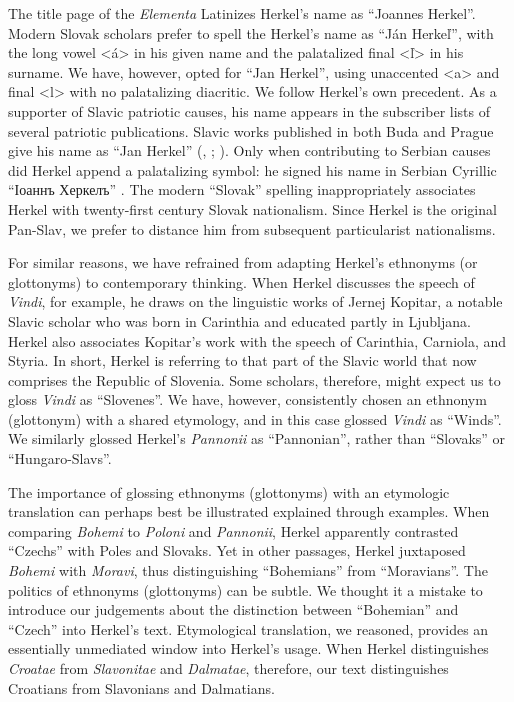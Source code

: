 The title page of the \textit{Elementa} Latinizes Herkel’s name as “Joannes Herkel”. Modern Slovak scholars prefer to spell the Herkel’s name as “Ján Herkeľ”, with the long vowel <á> in his given name and the palatalized final <ľ> in his surname. We have, however, opted for “Jan Herkel”, using unaccented <a> and final <l> with no palatalizing diacritic. We follow Herkel’s own precedent. As a supporter of Slavic patriotic causes, his name appears in the subscriber lists of several patriotic publications. Slavic works published in both Buda and Prague give his name as “Jan Herkel” (, \cite[no page numbers]{anon_gmena_1827}; \cite[no page numbers]{kollar_rozprawy_1830}). Only when contributing to Serbian causes did Herkel append a palatalizing symbol: he signed his name in Serbian Cyrillic “Іоаннъ Херкелъ” \citep[no page numbers]{pacic_dodatak_1827}. The modern “Slovak” spelling inappropriately associates Herkel with twenty-first century Slovak nationalism. Since Herkel is the original Pan-Slav, we prefer to distance him from subsequent particularist nationalisms.

For similar reasons, we have refrained from adapting Herkel’s ethnonyms (or glottonyms) to contemporary thinking. When Herkel discusses the speech of \textit{Vindi}, for example, he draws on the linguistic works of Jernej Kopitar, a notable Slavic scholar who was born in Carinthia and educated partly in Ljubljana. Herkel also associates Kopitar’s work with the speech of Carinthia, Carniola, and Styria. In short, Herkel is referring to that part of the Slavic world that now comprises the Republic of Slovenia. Some scholars, therefore, might expect us to gloss \textit{Vindi} as “Slovenes”. We have, however, consistently chosen an ethnonym (glottonym) with a shared etymology, and in this case glossed \textit{Vindi} as “Winds”. We similarly glossed Herkel’s \textit{Pannonii} as “Pannonian”, rather than “Slovaks” or “Hungaro-Slavs”.

The importance of glossing ethnonyms (glottonyms) with an etymologic translation can perhaps best be illustrated explained through examples. When comparing \textit{Bohemi} to \textit{Poloni} and \textit{Pannonii}, Herkel apparently contrasted “Czechs” with Poles and Slovaks. Yet in other passages, Herkel juxtaposed \textit{Bohemi} with \textit{Moravi}, thus distinguishing “Bohemians” from “Moravians”. The politics of ethnonyms (glottonyms) can be subtle. We thought it a mistake to introduce our judgements about the distinction between “Bohemian” and “Czech” into Herkel’s text. Etymological translation, we reasoned, provides an essentially unmediated window into Herkel’s usage. When Herkel distinguishes \textit{Croatae} from \textit{Slavonitae} and \textit{Dalmatae}, therefore, our text distinguishes Croatians from Slavonians and Dalmatians.

